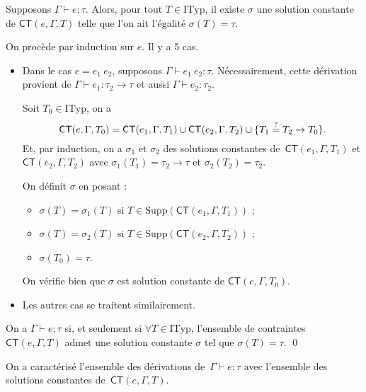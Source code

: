 \documentclass[../main]{subfiles}
\begin{document}
  \begin{prop}
    Supposons $\Gamma \vdash e : \tau$.
    Alors, pour tout $T \in \mathrm{ITyp}$, il existe $\sigma$ une solution constante de  $\mathsf{CT}(e, \Gamma, T)$ telle que l'on ait l'égalité $\sigma(T) = \tau$.
  \end{prop}

  \begin{prv}
    On procède par induction sur $e$. Il y a 5 cas.
    \begin{itemize}
      \item Dans le cas $e = e_1\ e_2$, supposons $\Gamma \vdash  e_1\ e_2 : \tau$.
        Nécessairement, cette dérivation provient de $\Gamma \vdash e_1 : \tau_2 \to \tau$ et aussi $\Gamma \vdash e_2 : \tau_2$.

        Soit $T_0 \in \mathrm{ITyp}$, on a \[
          \small
          \mathsf{CT}(e, \Gamma, T_0) = \mathsf{CT}(e_1, \Gamma, T_1) \cup \mathsf{CT}(e_2, \Gamma, T_2) \cup \{T_1 \mathrel{\overset ? =} T_2 \to T_0\}
        .\]
        Et, par induction, on a $\sigma_1$ et $\sigma_2$ des solutions constantes de~$\mathsf{CT}(e_1, \Gamma, T_1)$ et $\mathsf{CT}(e_2, \Gamma, T_2)$ avec $\sigma_1(T_1) = \tau_2 \to \tau$ et $\sigma_2(T_2) = \tau_2$.

        On définit $\sigma$ en posant :
         \begin{itemize}
          \item $\sigma(T) = \sigma_1(T)$ si $T \in \mathrm{Supp}(\mathsf{CT}(e_1, \Gamma, T_1))$ ;
          \item $\sigma(T) = \sigma_2(T)$ si $T \in \mathrm{Supp}(\mathsf{CT}(e_2, \Gamma, T_2))$ ;
          \item $\sigma(T_0) = \tau$.
        \end{itemize}
        On vérifie bien que $\sigma$ est solution constante de $\mathsf{CT}(e, \Gamma, T_0)$.
      \item Les autres cas se traitent similairement.
    \end{itemize}
  \end{prv}

  \begin{thm}
    On a $\Gamma \vdash e : \tau$ si, et seulement si $\forall T \in \mathrm{ITyp}$, l'ensemble de contraintes $\mathsf{CT}(e, \Gamma, T)$ admet une solution constante $\sigma$ tel que $\sigma(T) = \tau$.
    \qed
  \end{thm}

  \begin{rmk}
    On a caractérisé l'ensemble des dérivations de~$\Gamma \vdash e : \tau$ avec l'ensemble des solutions constantes de~$\mathsf{CT}(e, \Gamma, T)$.
  \end{rmk}
\end{document}
